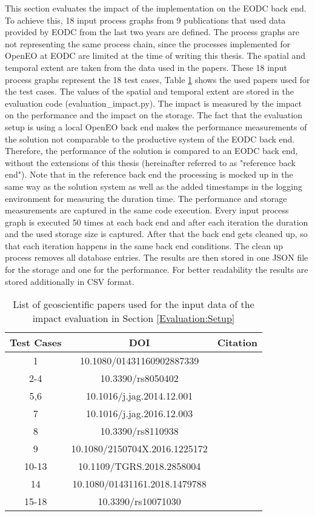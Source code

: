 \documentclass[draft,final]{vutinfth} %
\begin{document}
This section evaluates the impact of the implementation on the EODC back end. To achieve this, 18 input process graphs from 9 publications that used data provided by EODC from the last two years are defined. The process graphs are not representing the same process chain, since the processes implemented for OpenEO at EODC are limited at the time of writing this thesis. The spatial and temporal extent are taken from the data used in the papers. These 18 input process graphs represent the 18 test cases, Table \ref{Tab:appendix} shows the used papers used for the test cases. The values of the spatial and temporal extent are stored in the evaluation code (evaluation\_impact.py). The impact is measured by the impact on the performance and the impact on the storage. The fact that the evaluation setup is using a local OpenEO back end makes the performance measurements of the solution not comparable to the productive system of the EODC back end. Therefore, the performance of the solution is compared to an EODC back end, without the extensions of this thesis (hereinafter referred to as "reference back end"). Note that in the reference back end the processing is mocked up in the same way as the solution system as well as the added timestamps in the logging environment for measuring the duration time. The performance and storage measurements are captured in the same code execution. Every input process graph is executed 50 times at each back end and after each iteration the duration and the used storage size is captured. After that the back end gets cleaned up, so that each iteration happens in the same back end conditions. The clean up process removes all database entries. The results are then stored in one JSON file for the storage and one for the performance. For better readability the results are stored additionally in CSV format.      

\begin{table}[]
	\caption{List of geoscientific papers used for the input data of the impact evaluation in Section \ref{Evaluation:Setup}}
	\centering
	\begin{tabular}{c|c|c}
		\textbf{Test Cases} & \textbf{DOI} & \textbf{Citation}  \\ \hline
		1 & 10.1080/01431160902887339 & \cite{evaluation1} \\ 
		2-4 & 10.3390/rs8050402 & \cite{evaluation2} \\ 
		5,6 & 10.1016/j.jag.2014.12.001  & \cite{evaluation3} \\
		7 & 10.1016/j.jag.2016.12.003  & \cite{evaluation4} \\
		8 & 10.3390/rs8110938  & \cite{evaluation5} \\
		9 & 10.1080/2150704X.2016.1225172  & \cite{evaluation6} \\
		10-13 & 10.1109/TGRS.2018.2858004  & \cite{evaluation7} \\
		14 & 10.1080/01431161.2018.1479788  & \cite{evaluation8} \\
		15-18 & 10.3390/rs10071030  & \cite{evaluation9} \\
	\end{tabular}
	\label{Tab:appendix}
\end{table}
\end{document}
